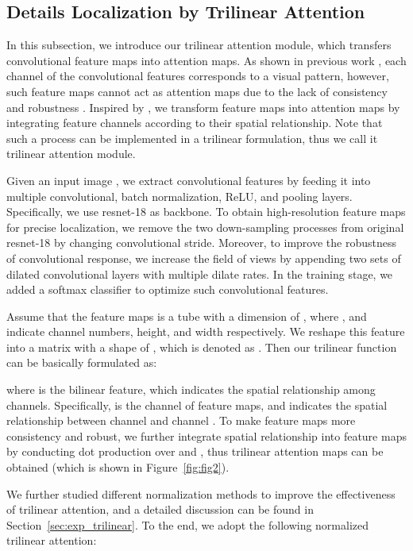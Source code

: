 \documentclass[10pt,twocolumn,letterpaper]{article}
\begin{document}
\subsection{Details Localization by Trilinear Attention}
\label{sec:attention}
In this subsection, we introduce our trilinear attention module, which transfers convolutional feature maps into attention maps. As shown in previous work \cite{Part-discovery, deepFilter}, each channel of the convolutional features corresponds to a visual pattern, however, such feature maps cannot act as attention maps due to the lack of consistency and robustness \cite{wei2017selective, Zheng_2017_ICCV}. Inspired by \cite{ Zheng_2017_ICCV}, we transform feature maps into attention maps by integrating feature channels according to their spatial relationship. Note that such a process can be implemented in a trilinear formulation, thus we call it trilinear attention module.

Given an input image , we extract convolutional features by feeding it into multiple convolutional, batch normalization, ReLU, and pooling layers. Specifically, we use resnet-18 \cite{ResNet} as backbone. To obtain high-resolution feature maps for precise localization, we remove the two down-sampling processes from original resnet-18 by changing convolutional stride. Moreover, to improve the robustness of convolutional response, we increase the field of views \cite{chen2018deeplab} by appending two sets of dilated convolutional layers with multiple dilate rates. In the training stage, we added a softmax classifier to optimize such convolutional features.


Assume that the feature maps is a tube with a dimension of , where ,  and  indicate channel numbers, height, and width respectively. We reshape this feature into a matrix with a shape of , which is denoted as . Then our trilinear function can be basically formulated as:

where  is the bilinear feature, which indicates the spatial relationship among channels. Specifically,  is the  channel of feature maps, and  indicates the spatial relationship between channel  and channel . To make feature maps more consistency and robust, we further integrate spatial relationship into feature maps by conducting dot production over  and , thus trilinear attention maps can be obtained (which is shown in Figure~\ref{fig:fig2}).

We further studied different normalization methods to improve the effectiveness of trilinear attention, and a detailed discussion can be found in Section~\ref{sec:exp_trilinear}. To the end, we adopt the following normalized trilinear attention:
\end{document}
